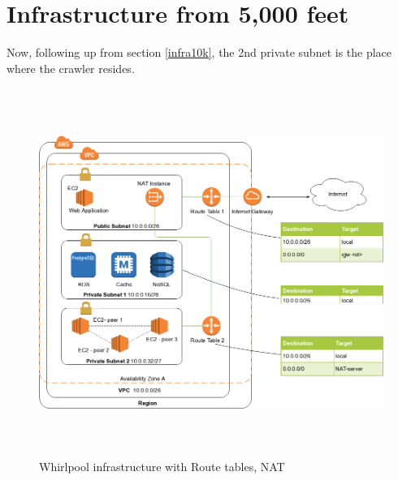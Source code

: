 \section{Infrastructure from 5,000 feet}
Now, following up from section \ref{infra10k}, the 2nd private subnet is the place where the crawler
resides.
\begin{figure}[h!]
  \centering
  \includegraphics[width=20cm,height=12cm,keepaspectratio]{../media/crawler/aws-deploy-5k-feet.png}
  \caption{Whirlpool infrastructure with Route tables, NAT}
  \label{fig:infra5k}
\end{figure}


